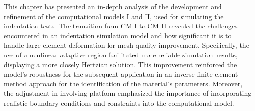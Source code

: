 This chapter has presented an in-depth analysis of the development and refinement of the computational models I and II, used
for simulating the indentation tests. The transition from CM I to CM II revealed the challenges encountered in an indentation 
simulation model and how significant it is to handle large element deformation for mesh quality improvement. 
Specifically, the use of a nonlinear adaptive region facilitated more reliable simulation results, displaying a more 
closely Hertzian solution. This improvement reinforced the model's robustness for the subsequent application in an inverse
finite element method approach for the identification of the material's parameters. Moreover, the adjustment in involving platform
emphasized the importance of incorporating realistic boundary conditions and constraints into the computational model.



